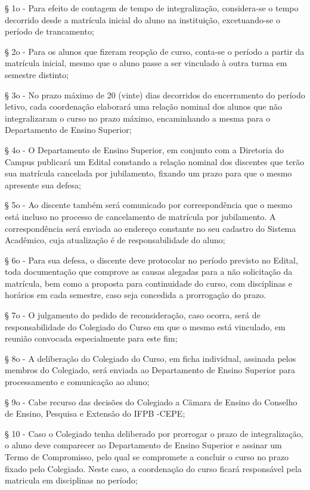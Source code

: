§ 1o - Para efeito de contagem de tempo de integralização, considera-se o tempo decorrido desde a matrícula inicial do aluno na instituição, excetuando-se o período de trancamento;

§ 2o - Para os alunos que fizeram reopção de curso, conta-se o período a partir da matrícula inicial, mesmo que o aluno passe a ser vinculado à outra turma em semestre distinto;

§ 3o - No prazo máximo de 20 (vinte) dias decorridos do encerramento do período letivo, cada coordenação elaborará uma relação nominal dos alunos que não integralizaram o curso no prazo máximo, encaminhando a mesma para o Departamento de Ensino Superior;

§ 4o - O Departamento de Ensino Superior, em conjunto com a Diretoria do Campus publicará um Edital constando a relação nominal dos discentes que terão sua matrícula cancelada por jubilamento, fixando um prazo para que o mesmo apresente sua defesa;

§ 5o - Ao discente também será comunicado por correspondência que o mesmo está incluso no processo de cancelamento de matrícula por jubilamento. A correspondência será enviada ao endereço constante no seu cadastro do Sistema Acadêmico, cuja atualização é de responsabilidade do aluno;

§ 6o - Para sua defesa, o discente deve protocolar no período previsto no Edital, toda documentação que comprove as causas alegadas para a não solicitação da matrícula, bem como a proposta para continuidade do curso, com disciplinas e horários em cada semestre, caso seja concedida a prorrogação do prazo.

§ 7o - O julgamento do pedido de reconsideração, caso ocorra, será de responsabilidade do Colegiado do Curso em que o mesmo está vinculado, em reunião convocada especialmente para este fim;

§ 8o - A deliberação do Colegiado do Curso, em ficha individual, assinada pelos membros do Colegiado, será enviada ao Departamento de Ensino Superior para processamento e comunicação ao aluno;

§ 9o - Cabe recurso das decisões do Colegiado a Câmara de Ensino do Conselho de Ensino, Pesquisa e Extensão do IFPB -CEPE;

§ 10 - Caso o Colegiado tenha deliberado por prorrogar o prazo de integralização, o aluno deve comparecer ao Departamento de Ensino Superior e assinar um Termo de Compromisso, pelo qual se compromete a concluir o curso no prazo fixado pelo Colegiado. Neste caso, a coordenação do curso ficará responsável pela matricula em disciplinas no período;

